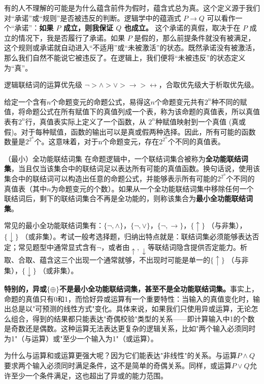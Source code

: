 \documentclass[lang=cn,11pt]{elegantbook}
\begin{document}
有的人不理解的可能是为什么蕴含前件为假时，蕴含式总为真。这个定义源于我们对“承诺”或“规则”是否被违反的判断。逻辑学中的蕴涵式 $P \rightarrow Q$ 可以看作一个“承诺”：\textbf{如果 $P$ 成立，则我保证 $Q$ 也成立。} 这个承诺的真假，取决于在 $P$ 成立的情况下，我是否履行了承诺。如果 $P$ 是假的，那么前提条件就没有被满足，这个规则或承诺就自动进入“不适用”或“未被激活”的状态。既然承诺没有被激活，那么我们自然不能说它被违反了。在逻辑上，我们便将“未被违反”的状态定义为“真”。
\begin{definition}{逻辑联结词的运算优先级}
    $\neg> \land> \lor> \rightarrow> \leftrightarrow$，合取优先级大于析取优先级。
\end{definition}
给定一个含有$n$个命题变元的命题公式，易得这$n$个命题变元共有$2^n$种不同的赋值，将命题公式在所有赋值下的真值列成一个表，称为该命题的真值表，所以真值表有$2^n$行，真值表实际上定义了一个函数，从 $2^n$种赋值映射到一个真值 (真或假)。对于每种赋值，函数的输出可以是真或假两种选择。因此，所有可能的函数数量是$2^{2^n}$个。这意味着，对于n个命题变元，存在$2^{2^n}$个不同的真值表。
\begin{definition}{（最小）全功能联结词集}
    在命题逻辑中，一个联结词集合被称为\textbf{全功能联结词集}，当且仅当该集合中的联结词足以表达所有可能的真值函数。换句话说，使用该集合中的联结词可以构造出任意的命题公式，并能够表示所有可能的$2^{2^n}$个不同的真值表（其中$n$为命题变元的个数）。如果从一个全功能联结词集中移除任何一个联结词后，剩下的联结词集合不再是全功能的，则称该集合为\textbf{最小全功能联结词集}。
\end{definition}
常见的最小全功能联结词集有：$\{\neg, \land\}$，$\{\neg, \lor\}$，$\{\neg, \rightarrow\}$，$\{\uparrow\}$ （与非集），$\{\downarrow\}$ （或非集）。考试一般考选择题，归纳出特点就是：联结词集必须能够表达否定；常见题型中通常显式含有$\neg$，或者由$\uparrow,\downarrow$等联结词隐含提供否定能力。析取、合取、蕴含这三个出现一个通常就够，不出现时可能是单一的$\{\uparrow\}$ （与非集），$\{\downarrow\}$ （或非集）。

\textbf{特别的，异或$\{\oplus\}$不是最小全功能联结词集，甚至不是全功能联结词集。}事实上，命题的真值只有0和1，而恰好异或运算有一个重要特性：当输入的真值变化时，输出总是以"可预测的线性方式"变化。具体来说，如果我们只使用异或运算，无论怎么组合，得到的结果都只能表达"奇偶校验"类型的关系——即计算输入中1的个数是奇数还是偶数。这种运算无法表达更复杂的逻辑关系，比如"两个输入必须同时为1"（与运算）或"至少一个输入为1"（或运算）。

为什么与运算和或运算更强大呢？因为它们能表达"非线性"的关系。与运算$P \land Q$要求两个输入必须同时满足条件，这不是简单的奇偶关系。同样，或运算$P \lor Q$允许至少一个条件满足，这也超出了异或的能力范围。
\end{document}

